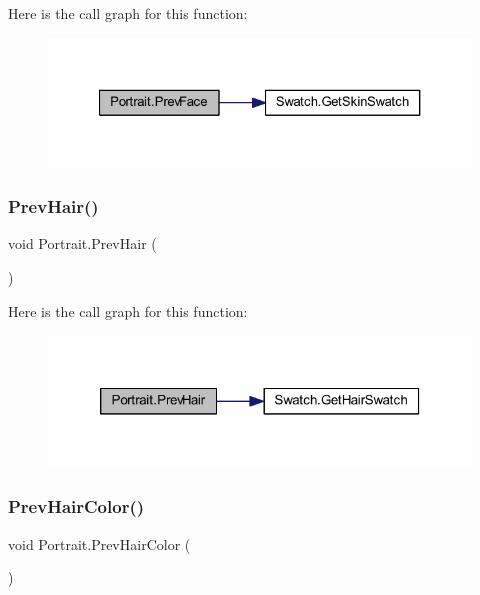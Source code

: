 Here is the call graph for this function\+:
\nopagebreak
\begin{figure}[H]
\begin{center}
\leavevmode
\includegraphics[width=327pt]{class_portrait_aa550ccd7202589090d88e812743da74a_cgraph}
\end{center}
\end{figure}
\mbox{\label{class_portrait_af7fdde58c645c6e4fa5195ed3547b3d9}} 
\subsubsection{\texorpdfstring{PrevHair()}{PrevHair()}}
{\footnotesize\ttfamily void Portrait.\+Prev\+Hair (\begin{DoxyParamCaption}{ }\end{DoxyParamCaption})}

Here is the call graph for this function\+:
\nopagebreak
\begin{figure}[H]
\begin{center}
\leavevmode
\includegraphics[width=320pt]{class_portrait_af7fdde58c645c6e4fa5195ed3547b3d9_cgraph}
\end{center}
\end{figure}
\mbox{\label{class_portrait_a29b9670f2b653ffe43cf81e94e90062a}} 
\subsubsection{\texorpdfstring{PrevHairColor()}{PrevHairColor()}}
{\footnotesize\ttfamily void Portrait.\+Prev\+Hair\+Color (\begin{DoxyParamCaption}{ }\end{DoxyParamCaption})}

